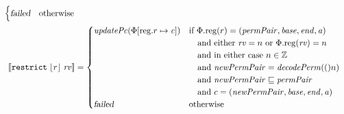 \documentclass[a4paper]{article}
\newcommand{\update}[2]{[#1 \mapsto #2]}
\newcommand{\sem}[1]{\left\llbracket #1 \right\rrbracket}
\newcommand{\var}[1]{\mathit{#1}}
\newcommand{\rv}{\var{rv}}
\newcommand{\gl}{\var{g}}
\newcommand{\addr}{\var{a}}
\newcommand{\start}{\var{base}}
\newcommand{\addrend}{\var{end}}
\newcommand{\perm}{\var{perm}}
\newcommand{\permp}{\var{permPair}}
\newcommand{\stdcap}[1][(\perm,\gl)]{\left(#1,\start,\addrend,\addr \right)}
\newcommand{\plainproj}[1]{\mathrm{#1}}
\newcommand{\memreg}[1][\Phi]{#1.\plainproj{reg}}
\newcommand{\updateReg}[3][\Phi]{#1\update{\plainproj{reg}.#2}{#3}}
\newcommand{\failed}{\textsl{failed}}
\newcommand{\plainfun}[2]{
  \ifthenelse{\equal{#2}{}}
             {\mathit{#1}}
             {\mathit{#1}(#2)}
}
\newcommand{\decodePermPair}{\plainfun{decodePerm}}
\newcommand{\stdUpdatePc}[1]{\plainfun{updatePc}{#1}}
\newcommand{\ints}{\mathbb{Z}}
\newcommand{\refreg}[1]{\lfloor #1 \rfloor}
\newcommand{\zinstr}[1]{\mathtt{#1}}
\newcommand{\twoinstr}[3]{\zinstr{#1} \; #2 \; #3}
\newcommand{\restricttwo}[2]{\twoinstr{restrict}{#1}{#2}}
\begin{document}
\begin{align*}
\begin{cases}
                                               \failed               & \text{otherwise}
                                             \end{cases} 
\\
  \sem{\restricttwo{\refreg{r}}{\rv}}           & =
                                             \begin{cases}
                                               \stdUpdatePc{\updateReg{r}{\var{c}}}  &
                                                 \arraycolsep=0pt
                                                 \begin{array}[t]{l}
                                                   \text{if $\memreg(r) = \stdcap[\permp]$}\\
                                                   \quad\text{and either $\rv = n$ or $\memreg(\rv) = n$}\\
                                                   \quad\text{and in either case $n \in \ints$}\\
                                                   \quad\text{and $\var{newPermPair} = \decodePermPair(n)$}\\
                                                   \quad\text{and $\var{newPermPair} \sqsubseteq \permp$}\\
                                                   \quad\text{and $c = (\var{newPermPair},\start,\addrend,\addr)$}
                                                 \end{array}\\
                                               \failed                   & \text{otherwise}
                                             \end{cases} 
\end{align*}
\end{document}
